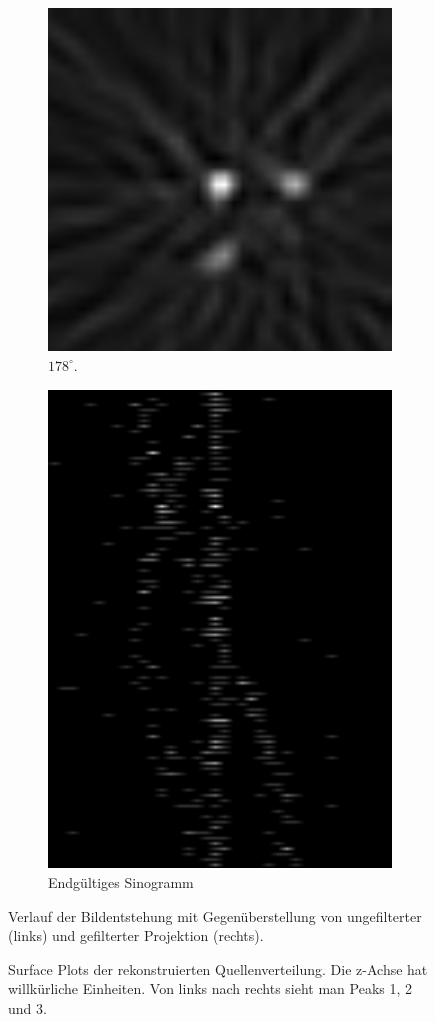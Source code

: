 \documentclass[slug=PET, room=Andreas-Schubert-Bau\,\ 424A,
supervisor=Carsten\ Bittrich, coursedate=10.\ 01.\ 2020, ngerman]{../../Lab_Report_LaTeX/lab_report}
\begin{document}
\begin{figure}[htp]
\begin{subfigure}{0.5\textwidth}
    \includegraphics[width=.4\textwidth]{../messungen/oliTOM1/15_gefiltert.png}
    \caption{\(178^\circ\).}
    \label{eq:tom1-178}
  \end{subfigure}
  \begin{subfigure}{\textwidth}
    \centering
    \includegraphics[width=.3\textwidth, angle=90]{../messungen/oliTOM1/sino.png}
    \caption{Endg\"ultiges Sinogramm}
    \label{fig:tom1-sino}
  \end{subfigure}
  \caption{Verlauf der Bildentstehung mit Gegenüberstellung von
    ungefilterter (links) und gefilterter Projektion (rechts).}
  \label{fig:tom1}
\end{figure}

\begin{figure}[bp]\centering
  
  \caption[Rekonstruierte Quellenverteilung]{Surface Plots der
    rekonstruierten Quellenverteilung. Die z-Achse hat willk\"urliche
    Einheiten. Von links nach rechts sieht man Peaks 1, 2 und 3.}
  \label{fig:tom1-3dplot}
\end{figure}
\end{document}
